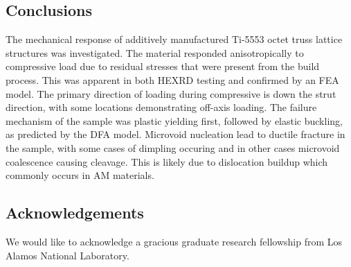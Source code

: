 \subsection{Conclusions}
The mechanical response of additively manufactured Ti-5553 octet truss lattice structures was investigated. The material responded anisotropically to compressive load due to residual stresses that were present from the build process. This was apparent in both HEXRD testing and confirmed by an FEA model.  The primary direction of loading during compressive is down the strut direction, with some locations demonstrating off-axis loading. The failure mechanism of the sample was plastic yielding first, followed by elastic buckling, as predicted by the DFA model. Microvoid nucleation lead to ductile fracture in the sample, with some cases of dimpling occuring and in other cases microvoid coalescence causing cleavage. This is likely due to dislocation buildup which commonly occurs in AM materials.

\subsection*{Acknowledgements}
We would like to acknowledge a gracious graduate research fellowship from Los Alamos National Laboratory.
